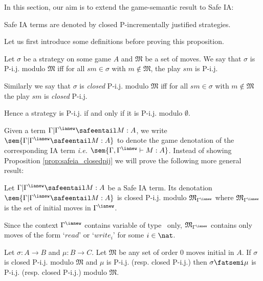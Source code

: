 In this section, our aim is to extend the game-semantic result to
Safe IA:
\begin{proposition}
\label{prop:safeia_closedpij} Safe IA terms are denoted by closed
P-incrementally justified strategies.
\end{proposition}


Let us first introduce some definitions before proving this
proposition.

\begin{definition}
\label{def:pij_modulo} Let $\sigma$ be a strategy on some game $A$
and $\mathfrak{M}$ be a set of moves. We say that $\sigma$ is P-i.j.
modulo $\mathfrak{M}$ iff for all $s m \in \sigma$ with $m \not\in
\mathfrak{M}$, the play $s m$ is P-i.j.

Similarly we say that $\sigma$ is \emph{closed} P-i.j. modulo
$\mathfrak{M}$ iff for all $s m \in \sigma$ with $m \not\in
\mathfrak{M}$ the play $s m$ is \emph{closed} P-i.j.

Hence a strategy is P-i.j. if and only if it is P-i.j. modulo
$\emptyset$.
\end{definition}

Given a term $\Gamma | \Gamma^{\ianew} \safeentail M : A$, we write
$\sem{\Gamma | \Gamma^{\ianew} \safeentail M : A}$ to denote the
game denotation of the corresponding IA term {\it i.e.}
$\sem{\Gamma, \Gamma^{\ianew} \vdash M : A}$. Instead of showing
Proposition \ref{prop:safeia_closedpij} we will prove the following
more general result:
\begin{proposition}
\label{prop:safeia_closedpijmodulo} Let $\Gamma | \Gamma^{\ianew}
\safeentail M : A $ be a Safe IA term. Its denotation $\sem{\Gamma |
\Gamma^{\ianew} \safeentail M : A}$ is closed P-i.j. modulo
$\mathfrak{M}_{\Gamma^{\ianew}}$ where
$\mathfrak{M}_{\Gamma^{\ianew}}$ is the set of initial moves in
$\Gamma^{\ianew}$.
\end{proposition}

\begin{remark}
Since the context $\Gamma^{\ianew}$ contains variable of type
\iavar\ only, $\mathfrak{M}_{\Gamma^{\ianew}}$ contains only moves
of the form `$read$' or `$write_i$' for some $i\in \nat$.
\end{remark}

\begin{lemma}
\label{lem:leftcompos_preserv_pijmodulo}
 Let $\sigma : A \rightarrow
B$ and $\mu : B \rightarrow C$.
  Let $\mathfrak{M}$ be any set of order $0$ moves initial in $A$.
  If $\sigma$ is closed  P-i.j. modulo $\mathfrak{M}$ and $\mu$ is
  P-i.j. (resp. closed P-i.j.) then $\sigma \fatsemi \mu$ is P-i.j. (resp. closed P-i.j.) modulo $\mathfrak{M}$.
\end{lemma}


